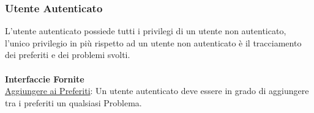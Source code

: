 \documentclass[11pt, a4paper]{article}
\theoremstyle{definition} %
\begin{document}

\subsubsection{Utente Autenticato}
L'utente autenticato possiede tutti i privilegi di un utente non autenticato, l'unico privilegio in più rispetto ad un utente non autenticato è il tracciamento dei preferiti e dei problemi svolti.
\\\\\textbf{Interfaccie Fornite}
\\
\underline{Aggiungere ai Preferiti}: Un utente autenticato deve essere in grado di aggiungere tra i preferiti un qualsiasi Problema.
\end{document}
